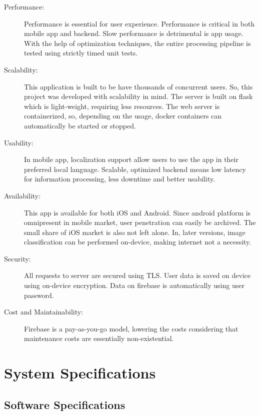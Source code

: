 \documentclass[../Report.tex]{subfiles}
\begin{document}
\begin{description}
  \item[Performance:] Performance is essential for user experience. Performance is critical in both mobile app and backend. Slow performance 
  is detrimental is app usage. With the help of optimization techniques, the entire processing pipeline is tested using strictly timed 
  unit tests.
  
  \item[Scalability:] This application is built to be have thousands of concurrent users. So, this project was developed with scalability in 
  mind. The server is built on flask which is light-weight, requiring less resources. The web server is containerized, so, depending on the 
  usage, docker containers can automatically be started or stopped.

  \item[Usability:] In mobile app, localization support allow users to use the app in their preferred local language. Scalable, optimized 
  backend means low latency for information processing, less downtime and better usability.

  \item[Availability:] This app is available for both iOS and Android. Since android platform is omnipresent in mobile market, user 
  penetration can easily be archived. The small share of iOS market is also not left alone. In, later versions, image classification
  can be performed on-device, making internet not a necessity.

  \item[Security:] All requests to server are secured using TLS. User data is saved on device using on-device encryption. Data on 
  firebase is automatically using user password.

  \item[Cost and Maintainability: ] Firebase is a pay-as-you-go model, lowering the costs considering that maintenance costs are 
  essentially non-existential.
\end{description} 

\section{System Specifications}

\subsection{Software Specifications}
\end{document}
